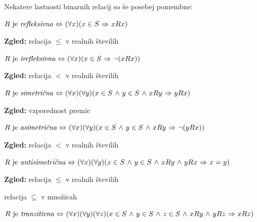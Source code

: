 \documentclass[11pt,paper=b5,footinclude,headinclude]{scrbook} %
\def\inn {{~\wedge~}}
\def\sledi {{~\Rightarrow~}}
\def\cee {{~\Leftrightarrow~}}
\begin{document}
Nekatere lastnosti binarnih relacij so še posebej pomembne:

\bigskip

$R \textrm{ je {\em refleksivna}} \cee (\forall x)(x\in S\sledi xRx)$


\textbf{ Zgled:} relacija $\le$ v realnih številih

\bigskip

$R \textrm{ je {\em irefleksivna}} \cee (\forall x)(x\in S\sledi \neg(xRx))$


\textbf{ Zgled:} relacija $<$ v realnih številih

\bigskip

$R \textrm{ je {\em simetrična}} \cee (\forall x)(\forall y)(x\in S\inn y\in S\inn xRy\sledi yRx)$

%
\textbf{ Zgled:} vzporednost premic


\bigskip

$R \textrm{ je {\em asimetrična}} \cee (\forall x)(\forall y)(x\in S\inn y\in S\inn xRy\sledi \neg(yRx))$


\textbf{ Zgled:} relacija $<$ v realnih številih


\bigskip
$R \textrm{ je {\em antisimetrična}} \cee (\forall x)(\forall y)(x\in S\inn y\in S\inn xRy\inn yRx\sledi x = y)$

\textbf{ Zgled:}
relacija $\le$ v realnih številih

relacija $\subseteq$ v množicah

\bigskip

$R \textrm{ je {\em tranzitivna}} \cee (\forall x)(\forall y)(\forall z)(x\in S\inn y\in S\inn z\in S\inn xRy\inn yRz\sledi xRz)$

\end{document}
